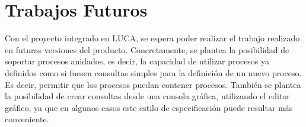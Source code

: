\section{Trabajos Futuros}

Con el proyecto integrado en LUCA, se espera poder realizar el trabajo realizado en futuras versiones del producto. Concretamente, se plantea la posibilidad de soportar procesos anidados, es decir, la capacidad de utilizar procesos ya definidos como si fuesen consultas simples para la definición de un nuevo proceso. Es decir, permitir que los procesos puedan contener procesos. También se plantea la posibilidad de crear consultas desde una consola gráfica, utilizando el editor gráfico, ya que en algunos casos este estilo de especificación puede resultar más conveniente.


	